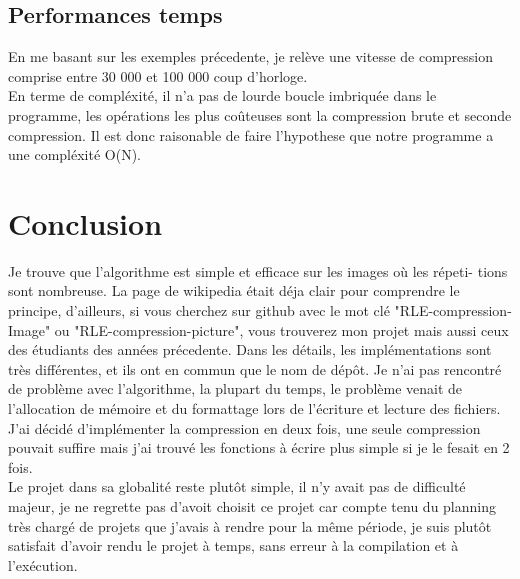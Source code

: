 \documentclass[12pt, letterpaper]{article}
\begin{document}
\subsection{Performances temps}
En me basant sur les exemples précedente, je relève une vitesse de 
compression comprise entre 30 000 et 100 000 coup d'horloge.\\
En terme de compléxité, il n'a pas de lourde boucle imbriquée dans le programme, les opérations 
les plus coûteuses sont la compression brute et seconde compression. Il est donc raisonable de faire 
l'hypothese que notre programme a une compléxité O(N).



\section{Conclusion}
Je trouve que l'algorithme est simple et efficace sur les images où les répeti- tions sont nombreuse. La page de wikipedia était déja clair pour comprendre le principe, d'ailleurs, si vous 
cherchez sur github avec le mot clé "RLE-compression-Image" ou "RLE-compression-picture", vous trouverez mon projet mais aussi ceux des étudiants des années précedente. Dans les détails, les implémentations 
sont très différentes, et ils ont en commun que le nom de dépôt.
Je n'ai pas rencontré de problème avec l'algorithme, la plupart du temps, 
le problème venait de \\l'allocation de mémoire et du formattage lors de l'écriture et lecture des fichiers.\\
J'ai décidé d'implémenter la compression en deux fois, une seule compression pouvait suffire mais j'ai trouvé les fonctions à écrire plus simple si je le fesait en 2 fois.\\
Le projet dans sa globalité reste plutôt simple, il n'y avait pas de difficulté majeur, je ne regrette pas d'avoit choisit ce projet car compte tenu 
du planning très chargé de projets que j'avais à rendre pour la même période, je suis plutôt satisfait d'avoir rendu le projet à temps, sans erreur à la compilation et à l'exécution.
\end{document}
